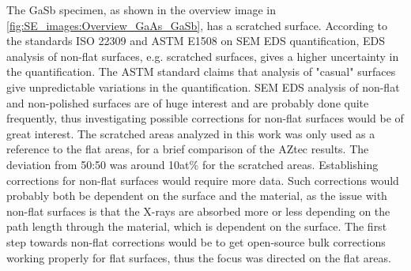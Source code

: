 

The GaSb specimen, as shown in the overview image in \cref{fig:SE_images:Overview_GaAs_GaSb}, has a scratched surface.
According to the standards ISO 22309 \cite{iso_quantification_22309} and ASTM E1508 \cite{astm_e1508_eds_quantification} on SEM EDS quantification, EDS analysis of non-flat surfaces, e.g. scratched surfaces, gives a higher uncertainty in the quantification.
The ASTM standard claims that analysis of "casual" surfaces give unpredictable variations in the quantification.
SEM EDS analysis of non-flat and non-polished surfaces are of huge interest and are probably done quite frequently, thus investigating possible corrections for non-flat surfaces would be of great interest.
The scratched areas analyzed in this work was only used as a reference to the flat areas, for a brief comparison of the AZtec results.
The deviation from 50:50 was around 10at\% for the scratched areas.
Establishing corrections for non-flat surfaces would require more data.
Such corrections would probably both be dependent on the surface and the material, as the issue with non-flat surfaces is that the X-rays are absorbed more or less depending on the path length through the material, which is dependent on the surface.
The first step towards non-flat corrections would be to get open-source bulk corrections working properly for flat surfaces, thus the focus was directed on the flat areas.


